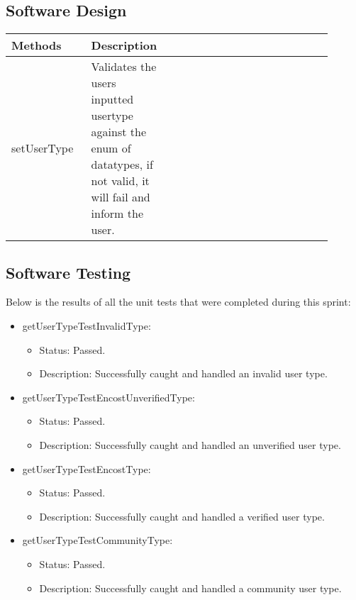 \documentclass{scrreprt}
\begin{document}
% 
\subsection{Software Design}

\begin{table}[h!]
\begin{tabular}{|p{0.25\linewidth}
                |p{0.1\linewidth}
                |p{0.45\linewidth}
                |p{0.1\linewidth}|}
    \hline
    Methods & Description \\
    \hline
    setUserType       &   Validates the users inputted usertype against the enum of datatypes, if not valid, it will fail and inform the user. \\
    \hline
\end{tabular}
\end{table}

% 
\subsection{Software Testing}

Below is the results of all the unit tests that were completed during this sprint:

\begin{itemize}
    \item getUserTypeTestInvalidType:
    \begin{itemize}
        \item Status: Passed.
        \item Description: Successfully caught and handled an invalid user type.
    \end{itemize}
    \item getUserTypeTestEncostUnverifiedType:
    \begin{itemize}
        \item Status: Passed.
        \item Description: Successfully caught and handled an unverified user type.
    \end{itemize}
    \item getUserTypeTestEncostType:
    \begin{itemize}
        \item Status: Passed.
        \item Description: Successfully caught and handled a verified user type.
    \end{itemize}
    \item getUserTypeTestCommunityType:
    \begin{itemize}
        \item Status: Passed.
        \item Description: Successfully caught and handled a community user type.
    \end{itemize}
\end{itemize}
\end{document}
